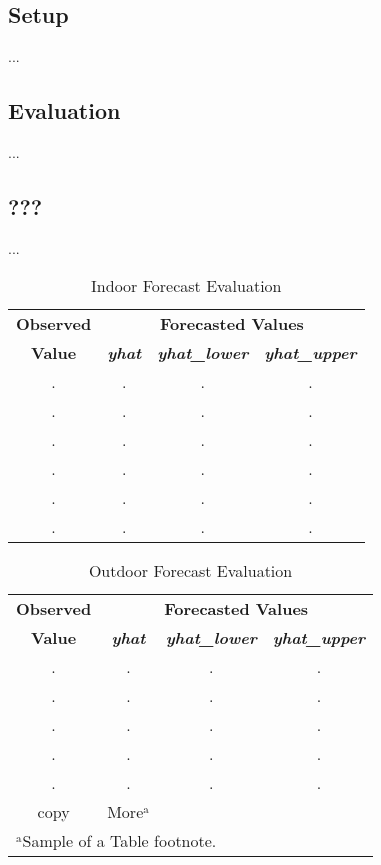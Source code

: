 \documentclass[conference]{IEEEtran}
\begin{document}
\subsection{Setup}
...

\subsection{Evaluation}
...

\subsection{???}
...

\begin{table}[htbp]
\caption{Indoor Forecast Evaluation}
\begin{center}
\begin{tabular}{|c|c|c|c|}
\hline
\textbf{Observed}&\multicolumn{3}{|c|}{\textbf{Forecasted Values}} \\
\cline{2-4} 
\textbf{Value} & \textbf{\textit{yhat}}& \textbf{\textit{yhat\_lower}}& \textbf{\textit{yhat\_upper}} \\
\hline
. & . & . & . \\
\hline
. & . & . & . \\
\hline
. & . & . & . \\
\hline
. & . & . & . \\
\hline
. & . & . & . \\
\hline
. & . & . & . \\
\hline
\end{tabular}
\label{tab_forecast_indoor}
\end{center}
\end{table}

\begin{table}[htbp]
\caption{Outdoor Forecast Evaluation}
\begin{center}
\begin{tabular}{|c|c|c|c|}
\hline
\textbf{Observed}&\multicolumn{3}{|c|}{\textbf{Forecasted Values}} \\
\cline{2-4} 
\textbf{Value} & \textbf{\textit{yhat}}& \textbf{\textit{yhat\_lower}}& \textbf{\textit{yhat\_upper}} \\
\hline
. & . & . & . \\
\hline
. & . & . & . \\
\hline
. & . & . & . \\
\hline
. & . & . & . \\
\hline
. & . & . & . \\
\hline
copy& More$^{\mathrm{a}}$& &  \\
\hline
\multicolumn{4}{l}{$^{\mathrm{a}}$Sample of a Table footnote.}
\end{tabular}
\label{tab_forecast_outdoor}
\end{center}
\end{table}
\end{document}
